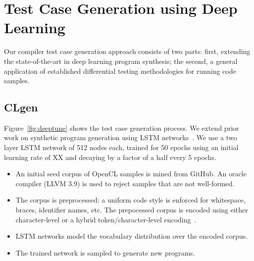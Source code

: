\section{Test Case Generation using Deep Learning}

Our compiler test case generation approach consists of two parts: first, extending the state-of-the-art in deep learning program synthesis; the second, a general application of established differential testing methodologies for running code samples.


\subsection{CLgen}

Figure~\ref{fig:deeptune} shows the test case generation process. We extend prior work on synthetic program generation using LSTM networks~\cite{Cummins2017a}. We use a two layer LSTM network of 512 nodes each, trained for 50 epochs using an initial learning rate of XX and decaying by a factor of a half every 5 epochs.

\begin{itemize}
\item An initial seed corpus of OpenCL samples is mined from GitHub. An oracle compiler (LLVM 3.9) is used to reject samples that are not well-formed.
\item The corpus is preprocessed: a uniform code style is enforced for whitespace, braces, identifier names, etc. The prepocessed corpus is encoded using either character-level or a hybrid token/character-level encoding~\cite{Cummins2017b}.
\item LSTM networks model the vocabulary distribution over the encoded corpus.
\item The trained network is sampled to generate new programs.
\end{itemize}

%



